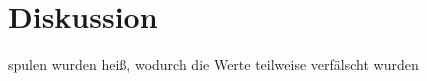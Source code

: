 \section{Diskussion}
\label{sec:Diskussion}

spulen wurden heiß, wodurch die Werte teilweise verfälscht wurden
